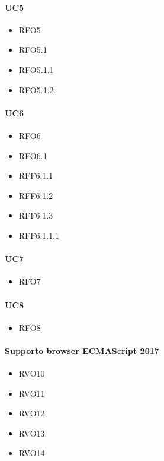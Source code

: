 \paragraph{UC5}
\quad
\begin{multicols}{3}
    \begin{itemize}
        \item RFO5
        \item RFO5.1
        \item RFO5.1.1
        \item RFO5.1.2
    \end{itemize}
\end{multicols}

\paragraph{UC6}
\quad
\begin{multicols}{3}
    \begin{itemize}
        \item RFO6
        \item RFO6.1
        \item RFF6.1.1
        \item RFF6.1.2
        \item RFF6.1.3
        \item RFF6.1.1.1
    \end{itemize}
\end{multicols}

\paragraph{UC7}
\quad
\begin{multicols}{3}
    \begin{itemize}
        \item RFO7
    \end{itemize}
\end{multicols}

\paragraph{UC8}
\quad
\begin{multicols}{3}
    \begin{itemize}
        \item RFO8
    \end{itemize}
\end{multicols}

\paragraph{Supporto browser ECMAScript 2017}
\quad
\begin{multicols}{3}
    \begin{itemize}
        \item RVO10
        \item RVO11
        \item RVO12
        \item RVO13
        \item RVO14
    \end{itemize}
\end{multicols}

